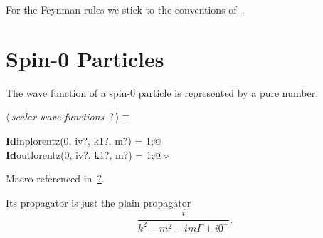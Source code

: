 \documentclass[a4paper,12pt]{amsart}
\renewcommand{\NWtarget}[2]{\hypertarget{#1}{#2}}
\renewcommand{\NWlink}[2]{\hyperlink{#1}{#2}}
\renewcommand{\NWtxtMacroRefIn}{Macro referenced in}
\renewcommand{\NWsep}{${\diamond}$}
\begin{document}
\begin{flushleft}
\begin{list}{}{\setlength{\itemsep}{-\parsep}\setlength{\itemindent}{-\leftmargin}}
\item{}
\end{list}
\vspace{4ex}
\end{flushleft}
For the Feynman rules we stick to the conventions of~\cite{1}.
\section{Spin-0 Particles}
The wave function of a spin-0 particle is represented by a pure number.
\begin{flushleft} \small
\begin{minipage}{\linewidth}\label{scrap4}\raggedright\small
\NWtarget{nuweb?}{} $\langle\,${\it scalar wave-functions}\nobreak\ {\footnotesize {?}}$\,\rangle\equiv$
\vspace{-1ex}
\begin{list}{}{} \item
\mbox{}\verb@@\hbox{\sffamily\bfseries Id}\verb@ inplorentz(0, iv?, k1?, m?) = 1;@\\
\mbox{}\verb@@\hbox{\sffamily\bfseries Id}\verb@ outlorentz(0, iv?, k1?, m?) = 1;@{\NWsep}
\end{list}
\vspace{-1.5ex}
\footnotesize
\begin{list}{}{\setlength{\itemsep}{-\parsep}\setlength{\itemindent}{-\leftmargin}}
\item \NWtxtMacroRefIn\ \NWlink{nuweb?}{?}.

\item{}
\end{list}
\end{minipage}\vspace{4ex}
\end{flushleft}
Its propagator is just the plain propagator
\begin{equation}
\frac{i}{k^2-m^2-im\Gamma+i0^+}\text{.}
\end{equation}
\end{document}
